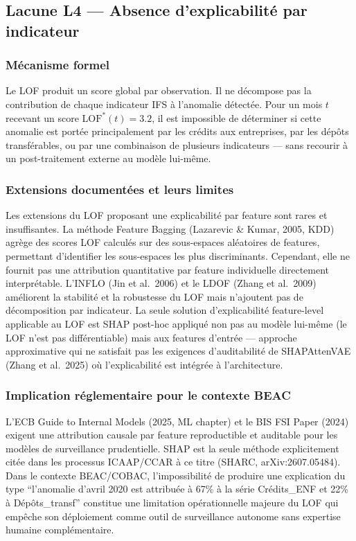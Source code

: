 \documentclass[12pt,a4paper]{article}
\begin{document}
\subsection{Lacune L4 --- Absence d'explicabilité par indicateur}

\subsubsection{Mécanisme formel}

Le LOF produit un score global par observation. Il ne décompose pas la
contribution de chaque indicateur IFS à l'anomalie détectée. Pour un mois
$t$ recevant un score $\mathrm{LOF}^*(t) = 3.2$, il est impossible de
déterminer si cette anomalie est portée principalement par les crédits aux
entreprises, par les dépôts transférables, ou par une combinaison de plusieurs
indicateurs --- sans recourir à un post-traitement externe au modèle lui-même.

\subsubsection{Extensions documentées et leurs limites}

Les extensions du LOF proposant une explicabilité par feature sont rares et
insuffisantes. La méthode Feature Bagging (Lazarevic \& Kumar, 2005, KDD)
agrège des scores LOF calculés sur des sous-espaces aléatoires de features,
permettant d'identifier les sous-espaces les plus discriminants. Cependant,
elle ne fournit pas une attribution quantitative par feature individuelle
directement interprétable. L'INFLO (Jin et al.\ 2006) et le LDOF (Zhang et al.\
2009) améliorent la stabilité et la robustesse du LOF mais n'ajoutent pas de
décomposition par indicateur. La seule solution d'explicabilité feature-level
applicable au LOF est SHAP post-hoc appliqué non pas au modèle lui-même
(le LOF n'est pas différentiable) mais aux features d'entrée --- approche
approximative qui ne satisfait pas les exigences d'auditabilité de SHAPAttenVAE
(Zhang et al.\ 2025) où l'explicabilité est intégrée à l'architecture.

\subsubsection{Implication réglementaire pour le contexte BEAC}

L'ECB Guide to Internal Models (2025, ML chapter) et le BIS FSI Paper (2024)
exigent une attribution causale par feature reproductible et auditable pour
les modèles de surveillance prudentielle. SHAP est la seule méthode
explicitement citée dans les processus ICAAP/CCAR à ce titre (SHARC,
arXiv:2607.05484). Dans le contexte BEAC/COBAC, l'impossibilité de produire
une explication du type ``l'anomalie d'avril 2020 est attribuée à 67\% à la
série Crédits\_ENF et 22\% à Dépôts\_transf'' constitue une limitation
opérationnelle majeure du LOF qui empêche son déploiement comme outil de
surveillance autonome sans expertise humaine complémentaire.
\end{document}
